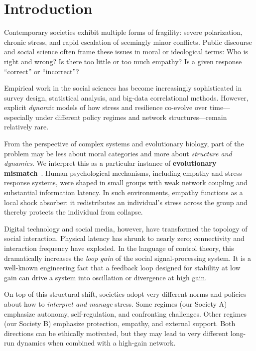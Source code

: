 \documentclass[11pt]{article}
\theoremstyle{plain}
\begin{document}
\begin{abstract}
The model is intentionally simplified and \emph{not} intended as a literal description of any real country or ideology; rather, it aims to illustrate a structural perspective in which empathy, network gain, grouping, and policy regimes interact to shape long-run social fragility.
\end{abstract}

\section{Introduction}

Contemporary societies exhibit multiple forms of fragility: severe polarization, chronic stress, and rapid escalation of seemingly minor conflicts.
Public discourse and social science often frame these issues in moral or ideological terms:
Who is right and wrong?  
Is there too little or too much empathy?  
Is a given response ``correct'' or ``incorrect''?

Empirical work in the social sciences has become increasingly sophisticated in survey design, statistical analysis, and big-data correlational methods.
However, explicit \emph{dynamic} models of how stress and resilience co-evolve over time---especially under different policy regimes and network structures---remain relatively rare.

From the perspective of complex systems and evolutionary biology, part of the problem may be less about moral categories and more about \emph{structure and dynamics}.
We interpret this as a particular instance of \textbf{evolutionary mismatch}~\cite{lloyd2011evolutionary}.
Human psychological mechanisms, including empathy and stress response systems, were shaped in small groups with weak network coupling and substantial information latency.
In such environments, empathy functions as a local shock absorber: it redistributes an individual's stress across the group and thereby protects the individual from collapse.

Digital technology and social media, however, have transformed the topology of social interaction.
Physical latency has shrunk to nearly zero; connectivity and interaction frequency have exploded.
In the language of control theory, this dramatically increases the \emph{loop gain} of the social signal-processing system.
It is a well-known engineering fact that a feedback loop designed for stability at low gain can drive a system into oscillation or divergence at high gain.

On top of this structural shift, societies adopt very different norms and policies about how to \emph{interpret and manage} stress.
Some regimes (our Society A) emphasize autonomy, self-regulation, and confronting challenges.
Other regimes (our Society B) emphasize protection, empathy, and external support.
Both directions can be ethically motivated, but they may lead to very different long-run dynamics when combined with a high-gain network.
\end{document}

